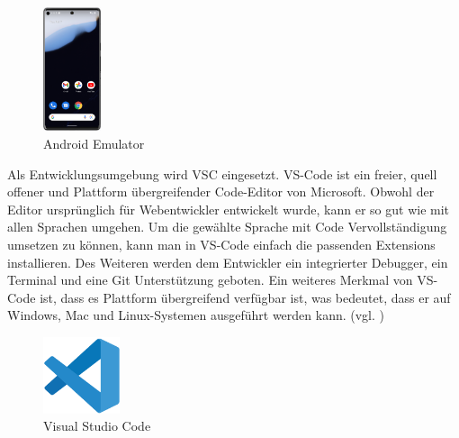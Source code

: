 \begin{figure}[h!]
  \centering

  \includegraphics[width=0.15\textwidth]{FLUTTER/images/ZB/android_emulator.png}
  \caption{Android Emulator}
\end{figure}

\newpage

Als Entwicklungsumgebung wird VSC eingesetzt. VS-Code ist ein freier, quell offener und Plattform übergreifender Code-Editor von Microsoft. Obwohl der Editor  ursprünglich für Webentwickler entwickelt wurde, kann er so gut wie mit allen Sprachen umgehen. Um die gewählte Sprache mit Code Vervollständigung umsetzen zu können, kann man in VS-Code einfach die passenden Extensions installieren. Des Weiteren werden dem Entwickler ein integrierter Debugger, ein Terminal und eine Git Unterstützung geboten. Ein weiteres Merkmal von VS-Code ist, dass es Plattform übergreifend verfügbar ist, was bedeutet, dass er auf Windows, Mac und Linux-Systemen ausgeführt werden kann. (vgl. \cite{VS-Code})

\begin{figure}[h!]
  \centering
  \vspace{1cm}
  \includegraphics[width=0.20\textwidth]{FLUTTER/images/ZB/vscode_logo.png}
  \caption{Visual Studio Code \cite{VSCode-Logo}}
\end{figure}